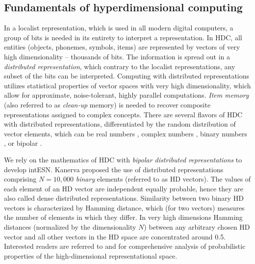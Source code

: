 \subsection{Fundamentals of hyperdimensional computing}
\label{sect:sparse}

In a localist representation, which is used in all modern digital
computers, a group of bits is needed in its entirety to interpret a representation.  
In HDC, all entities
(objects, phonemes, symbols, items) are represented by vectors of very high
dimensionality -- thousands of bits. The information is spread out in a {\it distributed representation}, which contrary to the
localist representations, any subset of the bits can be interpreted. 
Computing with distributed representations utilizes statistical
properties of vector spaces with very high dimensionality, which allow for approximate, noise-tolerant, highly parallel computations.
{\it Item memory} (also referred to as {\it clean-up} memory) is needed to recover
composite representations assigned to complex concepts. There are several flavors
of HDC with distributed representations, differentiated by the
random distribution of vector elements, which can be real numbers \cite{PlateTr,
Gallant, MAP, Gallant2016}, complex  numbers \cite{PlateBook}, binary numbers
\cite{Kanerva09, Rachkovskij2001}, or bipolar \cite{Gallant, HD_ICRC16}. 

We rely on the mathematics of HDC with  
{\it bipolar distributed representations} to develop intESN.
Kanerva \cite{Kanerva09} proposed the use of distributed representations comprising $N=10, 000$
{\it binary} elements (referred to as HD vectors). The values of each element of an HD vector are independent
equally probable, hence they are also called dense distributed representations.
Similarity between two binary HD vectors is characterized by  Hamming distance,
which (for two vectors) measures the number of elements in which they differ. 
In very high dimensions  Hamming distances (normalized by the dimensionality $N$)
 between any arbitrary chosen HD vector and all other vectors in the
HD space are concentrated around 0.5. Interested readers are referred to
\cite{Kanerva09} and \cite{KanervaBook} for comprehensive
analysis of probabilistic properties of the high-dimensional
representational space.

